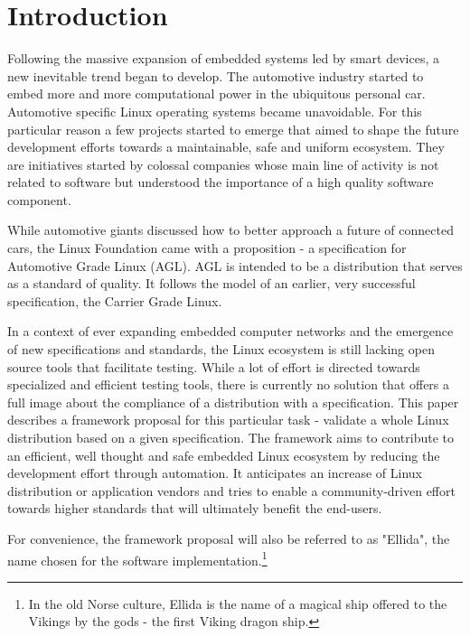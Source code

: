 \chapter{Introduction}

Following the massive expansion of embedded systems led by smart devices, a new inevitable trend began to develop. The automotive industry started to embed more and more computational power in the ubiquitous personal car. Automotive specific Linux operating systems  became unavoidable. For this particular reason a few projects started to emerge that aimed to shape the future development efforts towards a maintainable, safe and uniform ecosystem. They are initiatives started by colossal companies whose main line of activity is not related to software but understood the importance of a high quality software component.

While automotive giants discussed how to better approach a future of connected cars, the Linux Foundation came with a proposition - a specification for Automotive Grade Linux (AGL). AGL is intended to be a distribution that serves as a standard of quality. It follows the model of an earlier, very successful specification, the Carrier Grade Linux.

In a context of ever expanding embedded computer networks and the emergence of new specifications and standards, the Linux ecosystem is still lacking open source tools that facilitate testing. While a lot of effort is directed towards specialized and efficient testing tools, there is currently no solution that offers a full image about the compliance of a distribution with a specification. This paper describes a framework proposal for this particular task - validate a whole Linux distribution based on a given specification. The framework aims to contribute to an efficient, well thought and safe embedded Linux ecosystem by reducing the development effort through automation. It anticipates an increase of Linux distribution or application vendors and tries to enable a community-driven effort towards higher standards that will ultimately benefit the end-users.

For convenience, the framework proposal will also be referred to as "Ellida", the name chosen for the software implementation.\footnote{In the old Norse culture, Ellida is the name of a magical ship offered to the Vikings by the gods - the first Viking dragon ship.}

